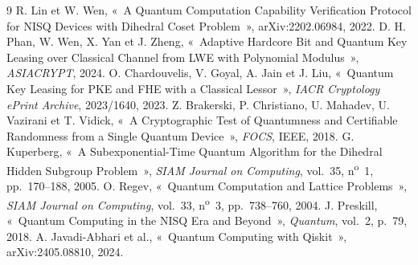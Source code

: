 {\small
\begin{thebibliography}{9}\setlength{\itemsep}{1pt}
 R. Lin et W. Wen, «~A Quantum Computation Capability Verification Protocol for NISQ Devices with Dihedral Coset Problem~», arXiv:2202.06984, 2022.
 D. H. Phan, W. Wen, X. Yan et J. Zheng, «~Adaptive Hardcore Bit and Quantum Key Leasing over Classical Channel from LWE with Polynomial Modulus~», \emph{ASIACRYPT}, 2024.
 O. Chardouvelis, V. Goyal, A. Jain et J. Liu, «~Quantum Key Leasing for PKE and FHE with a Classical Lessor~», \emph{IACR Cryptology ePrint Archive}, 2023/1640, 2023.
 Z. Brakerski, P. Christiano, U. Mahadev, U. Vazirani et T. Vidick, «~A Cryptographic Test of Quantumness and Certifiable Randomness from a Single Quantum Device~», \emph{FOCS}, IEEE, 2018.
 G. Kuperberg, «~A Subexponential-Time Quantum Algorithm for the Dihedral Hidden Subgroup Problem~», \emph{SIAM Journal on Computing}, vol.~35, n\textsuperscript{o}~1, pp.~170--188, 2005.
 O. Regev, «~Quantum Computation and Lattice Problems~», \emph{SIAM Journal on Computing}, vol.~33, n\textsuperscript{o}~3, pp.~738--760, 2004.
 J. Preskill, «~Quantum Computing in the NISQ Era and Beyond~», \emph{Quantum}, vol.~2, p.~79, 2018.
 A. Javadi-Abhari et al., «~Quantum Computing with Qiskit~», arXiv:2405.08810, 2024.
\end{thebibliography}}

